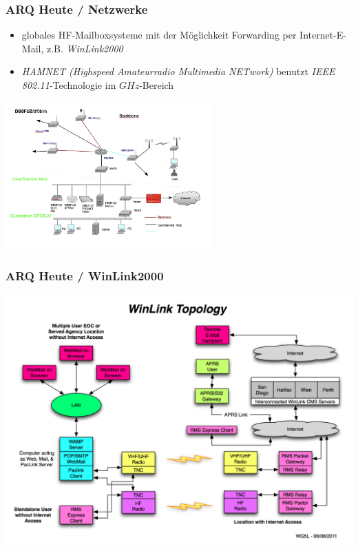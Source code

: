 \begin{frame}
    \frametitle{ARQ Heute / Netzwerke}

    \begin{itemize}
        \item globales HF-Mailboxsysteme mit der Möglichkeit Forwarding per
              Internet-E-Mail, z.B. \emph{WinLink2000}
        \item \emph{HAMNET (Highspeed Amateurradio Multimedia NETwork)} benutzt
              \emph{IEEE 802.11}-Technologie im $GHz$-Bereich
    \end{itemize}

    \begin{center}
        \includegraphics[width=0.6\textwidth,height=.55\textheight,keepaspectratio]{e16/db0fuz.png}
        \tiny \hyperlink{refs}{\cite{db0fuz}}
    \end{center}

\end{frame}

\begin{frame}
    \frametitle{ARQ Heute / WinLink2000}

    \begin{center}
        \includegraphics[width=.8\textwidth,height=.85\textheight,keepaspectratio]{e16/WinLink_Topology.jpg}
        \tiny \hyperlink{refs}{\cite{wl2k}}
    \end{center}

\end{frame}

